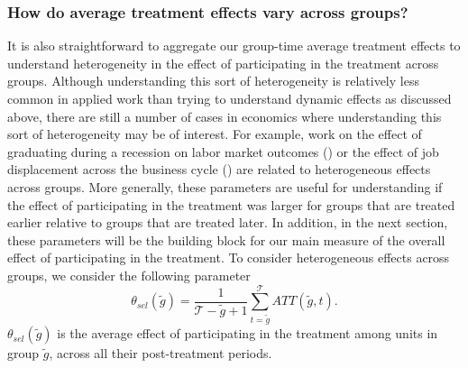 \documentclass[11pt]{article}%
\theoremstyle{plain}
\numberwithin{sassumption}{section}
\numberwithin{equation}{section}
\begin{document}
\subsubsection{How do average treatment effects vary across groups?}

It is also straightforward to aggregate our group-time average treatment
effects to understand heterogeneity in the effect of participating in the
treatment across groups. Although understanding this sort of heterogeneity is
relatively less common in applied work than trying to understand dynamic
effects as discussed above, there are still a number of cases in economics
where understanding this sort of heterogeneity may be of interest. For
example, work on the effect of graduating during a recession on labor market
outcomes (\citet{Oreopoulos2012}) or the effect of job displacement across the
business cycle (\citet{Farber2017}) are related to heterogeneous effects
across groups. More generally, these parameters are useful for understanding
if the effect of participating in the treatment was larger for groups that are
treated earlier relative to groups that are treated later. In addition, in the
next section, these parameters will be the building block for our main measure
of the overall effect of participating in the treatment. To consider
heterogeneous effects across groups, we consider the following parameter
\begin{equation}
\theta_{sel}(\tilde{g})=\frac{1}{\mathcal{T}-\tilde{g}+1}\sum_{t=\tilde{g}%
}^{\mathcal{T}}ATT(\tilde{g},t). \label{eqn:agg-sel}%
\end{equation}
$\theta_{sel}(\tilde{g})$ is the average effect of participating in the
treatment among units in group $\tilde{g}$, across all their post-treatment periods.
\end{document}
